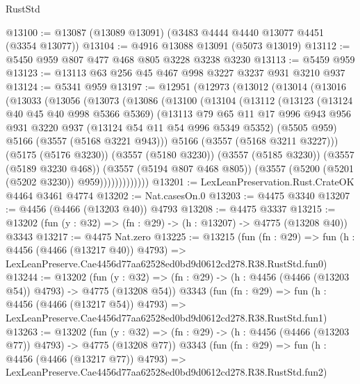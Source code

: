 \begin{lexlean}{RustStd}
\begin{coremodule}
@13100 := @13087 (@13089 @13091) (@3483 @4444 @4440 @13077 @4451 (@3354 @13077))
@13104 := @4916 @13088 @13091 (@5073 @13019)
@13112 := @5450 @959 @807 @477 @468 @805 @3228 @3238 @3230
@13113 := @5459 @959
@13123 := @13113 @63 @256 @45 @467 @998 @3227 @3237 @931 @3210 @937
@13124 := @5341 @959
@13197 := @12951
    (@12973
      (@13012
        (@13014
          (@13016
            (@13033
              (@13056
                (@13073
                  (@13086
                    (@13100
                      (@13104
                        (@13112
                          (@13123
                            (@13124 @40 @45 @40 @998 @5366 @5369)
                            (@13113
                              @79
                              @65
                              @11
                              @17
                              @996
                              @943
                              @956
                              @931
                              @3220
                              @937
                              (@13124 @54 @11 @54 @996 @5349 @5352)
                              (@5505 @959)
                              @5166
                              (@3557 (@5168 @3221 @943)))
                            @5166
                            (@3557 (@5168 @3211 @3227)))
                          (@5175 (@5176 @3230))
                          (@3557 (@5180 @3230))
                          (@3557 (@5185 @3230))
                          (@3557 (@5189 @3230 @468))
                          (@3557 (@5194 @807 @468 @805))
                          (@3557 (@5200 (@5201 (@5202 @3230)) @959)))))))))))))
@13201 := LexLeanPreservation.Rust.CrateOK @4464 @3461 @4774
@13202 := Nat.casesOn.{0}
@13203 := @4475 @3340
@13207 := @4456 (@4466 (@13203 @40)) @4793
@13208 := @4475 @3337
@13215 := @13202 (fun (y : @32) => (fn : @29) -> (h : @13207) -> @4775 (@13208 @40)) @3343
@13217 := @4475 Nat.zero
@13225 := @13215
    (fun (fn : @29) =>
    fun (h : @4456 (@4466 (@13217 @40)) @4793) =>
    LexLeanPreserve.Cae4456d77aa62528ed0bd9d0612cd278.R38.RustStd.fun0)
@13244 := @13202
    (fun (y : @32) => (fn : @29) -> (h : @4456 (@4466 (@13203 @54)) @4793) -> @4775 (@13208 @54))
    @3343
    (fun (fn : @29) =>
    fun (h : @4456 (@4466 (@13217 @54)) @4793) =>
    LexLeanPreserve.Cae4456d77aa62528ed0bd9d0612cd278.R38.RustStd.fun1)
@13263 := @13202
    (fun (y : @32) => (fn : @29) -> (h : @4456 (@4466 (@13203 @77)) @4793) -> @4775 (@13208 @77))
    @3343
    (fun (fn : @29) =>
    fun (h : @4456 (@4466 (@13217 @77)) @4793) =>
    LexLeanPreserve.Cae4456d77aa62528ed0bd9d0612cd278.R38.RustStd.fun2)

\end{coremodule}
\end{lexlean}
